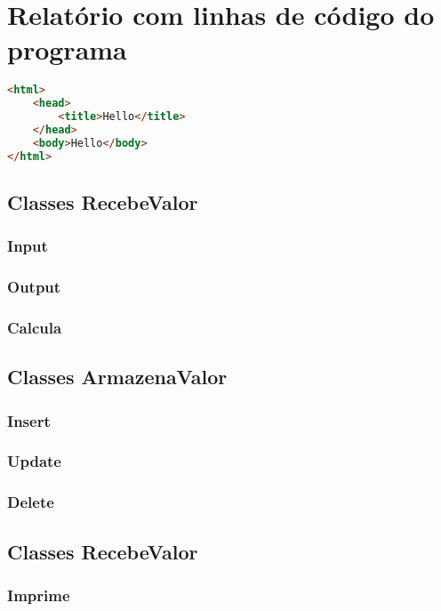 \section{Relatório com linhas de código do programa}
\begin{lstlisting}[language=html]
<html>
    <head>
        <title>Hello</title>
    </head>
    <body>Hello</body>
</html>
\end{lstlisting}


\subsection{Classes RecebeValor}
\subsubsection{Input}
\subsubsection{Output}
\subsubsection{Calcula}

\subsection{Classes ArmazenaValor}
\subsubsection{Insert}
\subsubsection{Update}
\subsubsection{Delete}

\subsection{Classes RecebeValor}
\subsubsection{Imprime}